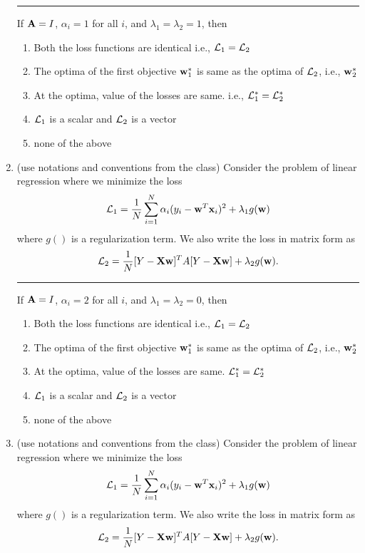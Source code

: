 \documentclass{article}
\begin{document}
\begin{enumerate}
    \hrule

    If ${\bf A} = I$, $\alpha_i = 1$ for all $i$, and $\lambda_1 = \lambda_2 = 1$, then
    \begin{enumerate}
        \item Both the loss functions are identical i.e., ${\cal L}_1 = {\cal L}_2$
        \item The optima of the first objective ${\bf w}_1^*$ is same as the optima of ${\cal L}_2$, i.e., ${\bf w}_2^*$
        \item At the optima,  value of the losses are same. i.e., ${\cal L}_1^* = {\cal L}_2^*$
        \item ${\cal L}_1$ is a scalar and ${\cal L}_2$ is a vector
        \item none of the above
    \end{enumerate}



      \item (use notations  and conventions from the class) Consider the problem of linear regression where we
    minimize the loss
    \[{\cal L}_1 = \frac{1}{N}\sum_{i=1}^N \alpha_i (y_i - {\bf w}^T{\bf x}_i)^2 + \lambda_1 g({\bf w})\] where $g()$ is a regularization term. We also write the loss in matrix form as \[ {\cal L}_2 = \frac{1}{N} [Y-{\bf X}{\bf w}]^TA[Y-{\bf X}{\bf w}] + \lambda_2 g({\bf w}). \]

    \hrule

    If ${\bf A} = I$, $\alpha_i = 2$ for all $i$, and $\lambda_1 = \lambda_2 = 0$, then
    \begin{enumerate}
        \item Both the loss functions are identical i.e., ${\cal L}_1 = {\cal L}_2$
        \item The optima of the first objective ${\bf w}_1^*$ is same as the optima of ${\cal L}_2$, i.e., ${\bf w}_2^*$
        \item At the optima, value of the losses are same. ${\cal L}_1^* = {\cal L}_2^*$
        \item ${\cal L}_1$ is a scalar and ${\cal L}_2$ is a vector
        \item none of the above
    \end{enumerate}



      \item (use notations  and conventions from the class) Consider the problem of linear regression where we
    minimize the loss
    \[{\cal L}_1 = \frac{1}{N}\sum_{i=1}^N \alpha_i (y_i - {\bf w}^T{\bf x}_i)^2 + \lambda_1 g({\bf w})\] where $g()$ is a regularization term. We also write the loss in matrix form as \[ {\cal L}_2 = \frac{1}{N} [Y-{\bf X}{\bf w}]^TA[Y-{\bf X}{\bf w}] + \lambda_2 g({\bf w}). \]


\end{enumerate}
\end{document}
